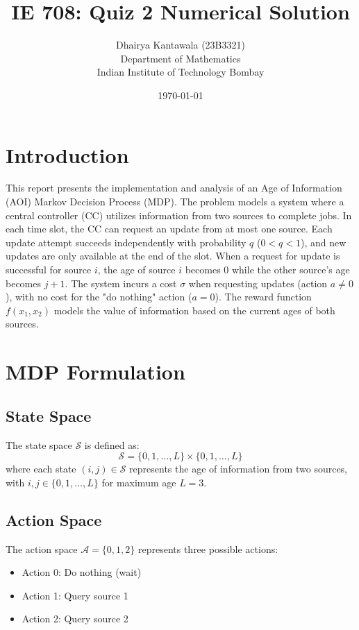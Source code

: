 \documentclass[12pt]{article}
\title{\textbf{IE 708: Quiz 2 Numerical Solution}}
\author{Dhairya Kantawala (23B3321) \\ Department of Mathematics \\ Indian Institute of Technology Bombay}
\date{\today}
\begin{document}
\maketitle

\section{Introduction}

This report presents the implementation and analysis of an Age of Information (AOI) Markov Decision Process (MDP). The problem models a system where a central controller (CC) utilizes information from two sources to complete jobs. In each time slot, the CC can request an update from at most one source. Each update attempt succeeds independently with probability $q$ ($0 < q < 1$), and new updates are only available at the end of the slot. When a request for update is successful for source $i$, the age of source $i$ becomes 0 while the other source's age becomes $j + 1$. The system incurs a cost $\sigma$ when requesting updates (action $a \neq 0$), with no cost for the "do nothing" action ($a = 0$). The reward function $f(x_1, x_2)$ models the value of information based on the current ages of both sources.

\section{MDP Formulation}

\subsection{State Space}
The state space $\mathcal{S}$ is defined as:
$$\mathcal{S} = \{0, 1, \ldots, L\} \times \{0, 1, \ldots, L\}$$
where each state $(i, j) \in \mathcal{S}$ represents the age of information from two sources, with $i, j \in \{0, 1, \ldots, L\}$ for maximum age $L = 3$.

\subsection{Action Space}
The action space $\mathcal{A} = \{0, 1, 2\}$ represents three possible actions:
\begin{itemize}
    \item Action 0: Do nothing (wait)
    \item Action 1: Query source 1
    \item Action 2: Query source 2
\end{itemize}
\end{document}
